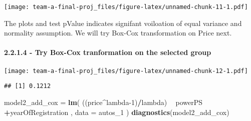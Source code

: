 \documentclass[]{article}
\newenvironment{Shaded}{\begin{snugshade}}{\end{snugshade}}
\newcommand{\DataTypeTok}[1]{\textcolor[rgb]{0.13,0.29,0.53}{#1}}
\newcommand{\DecValTok}[1]{\textcolor[rgb]{0.00,0.00,0.81}{#1}}
\newcommand{\FloatTok}[1]{\textcolor[rgb]{0.00,0.00,0.81}{#1}}
\newcommand{\KeywordTok}[1]{\textcolor[rgb]{0.13,0.29,0.53}{\textbf{#1}}}
\newcommand{\NormalTok}[1]{#1}
\newcommand{\OperatorTok}[1]{\textcolor[rgb]{0.81,0.36,0.00}{\textbf{#1}}}
\newcommand{\OtherTok}[1]{\textcolor[rgb]{0.56,0.35,0.01}{#1}}
\newcommand{\StringTok}[1]{\textcolor[rgb]{0.31,0.60,0.02}{#1}}
\let\oldparagraph\paragraph
\renewcommand{\paragraph}[1]{\oldparagraph{#1}\mbox{}}
\begin{document}
\texttt{[image: team-a-final-proj\_files/figure-latex/unnamed-chunk-11-1.pdf]}

The plots and test pValue indicates signifant voiloation of equal
variance and normality assumption. We will try Box-Cox transformation on
Price next.

\hypertarget{try-box-cox-tranformation-on-the-selected-group}{%
\paragraph{2.2.1.4 - Try Box-Cox tranformation on the selected
group}\label{try-box-cox-tranformation-on-the-selected-group}}

\begin{Shaded}
\end{Shaded}

\texttt{[image: team-a-final-proj\_files/figure-latex/unnamed-chunk-12-1.pdf]}

\begin{Shaded}
\end{Shaded}

\begin{verbatim}
## [1] 0.1212
\end{verbatim}

\begin{Shaded}
\begin{Highlighting}[]
\NormalTok{model2_add_cox =}\StringTok{ }\KeywordTok{lm}\NormalTok{( ((price}\OperatorTok{^}\NormalTok{lambda}\DecValTok{-1}\NormalTok{)}\OperatorTok{/}\NormalTok{lambda) }\OperatorTok{~}\StringTok{ }\NormalTok{powerPS }\OperatorTok{+}\NormalTok{yearOfRegistration , }\DataTypeTok{data =}\NormalTok{ autos_}\DecValTok{1}\NormalTok{ )}
\KeywordTok{diagnostics}\NormalTok{(model2_add_cox)}
\end{Highlighting}
\end{Shaded}
\end{document}
